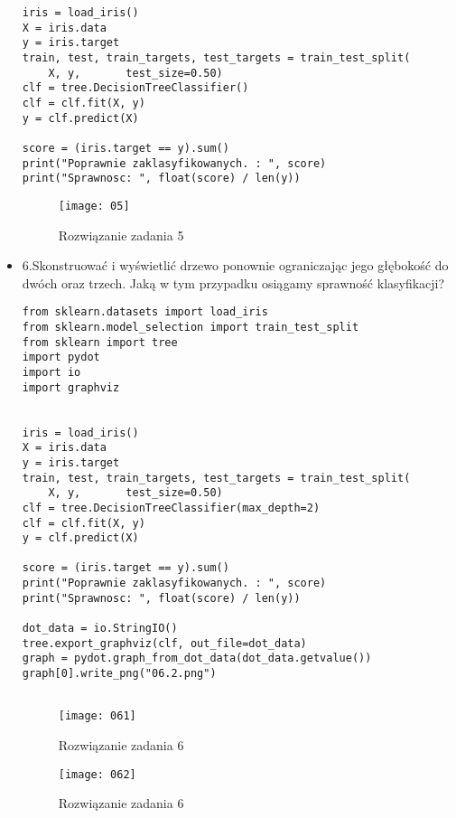 \documentclass[12pt,a4paper]{article}
\begin{document}
\begin{itemize}
\begin{lstlisting}
iris = load_iris()
X = iris.data
y = iris.target
train, test, train_targets, test_targets = train_test_split(
    X, y,       test_size=0.50)
clf = tree.DecisionTreeClassifier()
clf = clf.fit(X, y)
y = clf.predict(X)

score = (iris.target == y).sum()
print("Poprawnie zaklasyfikowanych. : ", score)
print("Sprawnosc: ", float(score) / len(y))

	\end{lstlisting}
		\begin{figure}[h]
                        \texttt{[image: 05]}
                        \centering
			\caption{Rozwiązanie zadania 5}
			\label{fig:fig5}
                \end{figure}
                \clearpage

        \item 6.Skonstruować i wyświetlić drzewo ponownie ograniczając jego głębokość do dwóch oraz trzech. Jaką w tym przypadku osiągamy sprawność klasyfikacji?
        \begin{lstlisting}
from sklearn.datasets import load_iris
from sklearn.model_selection import train_test_split
from sklearn import tree
import pydot
import io
import graphviz


iris = load_iris()
X = iris.data
y = iris.target
train, test, train_targets, test_targets = train_test_split(
    X, y,       test_size=0.50)
clf = tree.DecisionTreeClassifier(max_depth=2)
clf = clf.fit(X, y)
y = clf.predict(X)

score = (iris.target == y).sum()
print("Poprawnie zaklasyfikowanych. : ", score)
print("Sprawnosc: ", float(score) / len(y))

dot_data = io.StringIO()
tree.export_graphviz(clf, out_file=dot_data)
graph = pydot.graph_from_dot_data(dot_data.getvalue())
graph[0].write_png("06.2.png")
                
	\end{lstlisting}
		\begin{figure}[h]
                        \texttt{[image: 061]}
                        \centering
			\caption{Rozwiązanie zadania 6}
			\label{fig:fig6}
                \end{figure}
                \begin{figure}[h]
                        \texttt{[image: 062]}
                        \centering
			\caption{Rozwiązanie zadania 6}
			\label{fig:fig6.1}
                \end{figure}
                \clearpage


\end{itemize}
\end{document}
